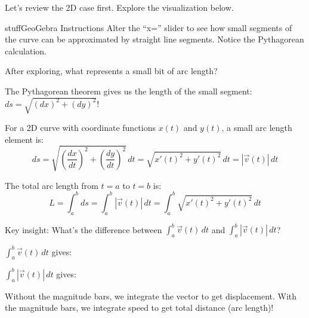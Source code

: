 \documentclass{ximera}
\begin{document}
\begin{problem}
Let's review the 2D case first. Explore the visualization below.

\begin{expandable}{stuff}{GeoGebra Instructions}
    Alter the ``x='' slider to see how small segments of the curve can be approximated by straight line segments. Notice the Pythagorean calculation.
\end{expandable}

\begin{center}
\end{center}

After exploring, what represents a small bit of arc length?
\begin{multipleChoice}
\end{multipleChoice}

\begin{feedback}
The Pythagorean theorem gives us the length of the small segment: $ds = \sqrt{(dx)^2 + (dy)^2}$!
\end{feedback}
\end{problem}

\begin{definition}
For a 2D curve with coordinate functions $x(t)$ and $y(t)$, a small arc length element is:
$$ds=\sqrt{\left(\frac{dx}{dt}\right)^2+\left(\frac{dy}{dt}\right)^2} \, dt=\sqrt{x'(t)^2+y'(t)^2} \, dt = |\vec{v}(t)| \, dt$$

The total arc length from $t=a$ to $t=b$ is:
$$L = \int_a^b ds = \int_a^b |\vec{v}(t)| \, dt = \int_a^b \sqrt{x'(t)^2+y'(t)^2} \, dt$$
\end{definition}

\begin{problem}
Key insight: What's the difference between $\int_a^b \vec{v}(t) \, dt$ and $\int_a^b |\vec{v}(t)| \, dt$?

$\int_a^b \vec{v}(t) \, dt$ gives:
\begin{multipleChoice}
\end{multipleChoice}

$\int_a^b |\vec{v}(t)| \, dt$ gives:
\begin{multipleChoice}
\end{multipleChoice}

\begin{feedback}
Without the magnitude bars, we integrate the vector to get displacement. With the magnitude bars, we integrate speed to get total distance (arc length)!
\end{feedback}
\end{problem}
\end{document}
